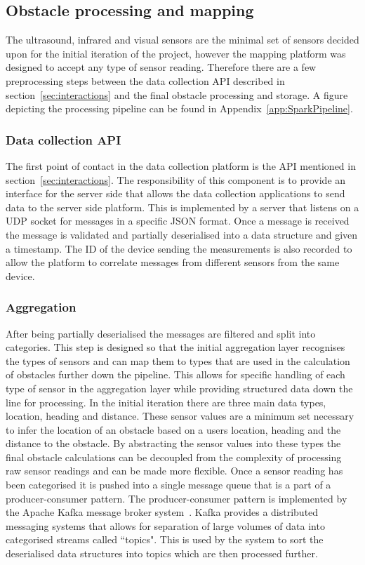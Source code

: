 \documentclass[prodmode,acmtosem]{acmsmall} %
\begin{document}
\subsection{Obstacle processing and mapping}
The ultrasound, infrared and visual sensors are the minimal set of sensors decided upon for the initial iteration of the project, however the mapping platform was designed to accept any type of sensor reading. Therefore there are a few preprocessing steps between the data collection API described in section~\ref{sec:interactions} and the final obstacle processing and storage. A figure depicting the processing pipeline can be found in Appendix~\ref{app:SparkPipeline}.

\subsubsection{Data collection API}
The first point of contact in the data collection platform is the API mentioned in section~\ref{sec:interactions}. The responsibility of this component is to provide an interface for the server side that allows the data collection applications to send data to the server side platform. This is implemented by a server that listens on a UDP socket for messages in a specific JSON format. Once a message is received the message is validated and partially deserialised into a data structure and given a timestamp. The ID of the device sending the measurements is also recorded to allow the platform to correlate messages from different sensors from the same device.

\subsubsection{Aggregation}
\label{sec:aggregation}
After being partially deserialised the messages are filtered and split into categories. This step is designed so that the initial aggregation layer recognises the types of sensors and can map them to types that are used in the calculation of obstacles further down the pipeline. This allows for specific handling of each type of sensor in the aggregation layer while providing structured data down the line for processing. In the initial iteration there are three main data types, location, heading and distance. These sensor values are a minimum set necessary to infer the location of an obstacle based on a users location, heading and the distance to the obstacle. By abstracting the sensor values into these types the final obstacle calculations can be decoupled from the complexity of processing raw sensor readings and can be made more flexible. Once a sensor reading has been categorised it is pushed into a single message queue that is a part of a producer-consumer pattern. The producer-consumer pattern is implemented by the Apache Kafka message broker system~\cite{ApacheKafka}. Kafka provides a distributed messaging systems that allows for separation of large volumes of data into categorised streams called ``topics". This is used by the system to sort the deserialised data structures into topics which are then processed further.
\end{document}
